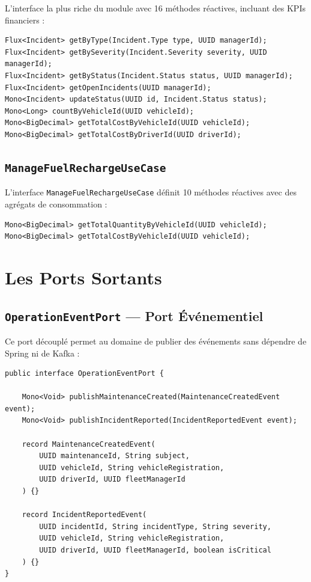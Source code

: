 \documentclass[12pt,a4paper]{report}
\begin{document}
L'interface la plus riche du module avec 16 méthodes réactives, incluant des KPIs financiers :

\begin{lstlisting}[style=javaStyle, caption={Méthodes KPI de ManageIncidentUseCase}]
Flux<Incident> getByType(Incident.Type type, UUID managerId);
Flux<Incident> getBySeverity(Incident.Severity severity, UUID managerId);
Flux<Incident> getByStatus(Incident.Status status, UUID managerId);
Flux<Incident> getOpenIncidents(UUID managerId);
Mono<Incident> updateStatus(UUID id, Incident.Status status);
Mono<Long> countByVehicleId(UUID vehicleId);
Mono<BigDecimal> getTotalCostByVehicleId(UUID vehicleId);
Mono<BigDecimal> getTotalCostByDriverId(UUID driverId);
\end{lstlisting}

\subsection{\texttt{ManageFuelRechargeUseCase}}

L'interface \texttt{ManageFuelRechargeUseCase} définit 10 méthodes réactives avec des agrégats de consommation :

\begin{lstlisting}[style=javaStyle, caption={Méthodes KPI de ManageFuelRechargeUseCase}]
Mono<BigDecimal> getTotalQuantityByVehicleId(UUID vehicleId);
Mono<BigDecimal> getTotalCostByVehicleId(UUID vehicleId);
\end{lstlisting}

\section{Les Ports Sortants}

\subsection{\texttt{OperationEventPort} — Port Événementiel}

Ce port découplé permet au domaine de publier des événements sans dépendre de Spring ni de Kafka :

\begin{lstlisting}[style=javaStyle, caption={Port événementiel OperationEventPort}]
public interface OperationEventPort {

    Mono<Void> publishMaintenanceCreated(MaintenanceCreatedEvent event);
    Mono<Void> publishIncidentReported(IncidentReportedEvent event);

    record MaintenanceCreatedEvent(
        UUID maintenanceId, String subject,
        UUID vehicleId, String vehicleRegistration,
        UUID driverId, UUID fleetManagerId
    ) {}

    record IncidentReportedEvent(
        UUID incidentId, String incidentType, String severity,
        UUID vehicleId, String vehicleRegistration,
        UUID driverId, UUID fleetManagerId, boolean isCritical
    ) {}
}
\end{lstlisting}
\end{document}
